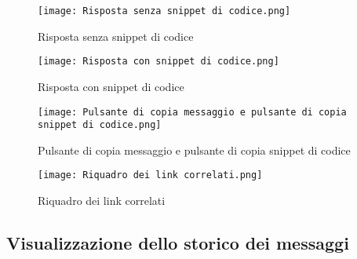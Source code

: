 \newpage
\begin{figure}[h]
    \centering
        \texttt{[image: Risposta senza snippet di codice.png]}
        \caption{Risposta senza snippet di codice}
        \label{fig:Risposta senza snippet di codice}        
\end{figure}
\begin{figure}[h]
    \centering
        \texttt{[image: Risposta con snippet di codice.png]}
        \caption{Risposta con snippet di codice}
        \label{fig:Risposta con snippet di codice}        
\end{figure}
\begin{figure}[h]
    \centering
        \texttt{[image: Pulsante di copia messaggio e pulsante di copia snippet di codice.png]}
        \caption{Pulsante di copia messaggio e pulsante di copia snippet di codice}
        \label{fig:Pulsante di copia messaggio e pulsante di copia snippet di codice}        
\end{figure}
\begin{figure}[h]
    \centering
        \texttt{[image: Riquadro dei link correlati.png]}
        \caption{Riquadro dei link correlati}
        \label{fig:Riquadro dei link correlati}        
\end{figure}

\newpage


\subsection{Visualizzazione dello storico dei messaggi}



